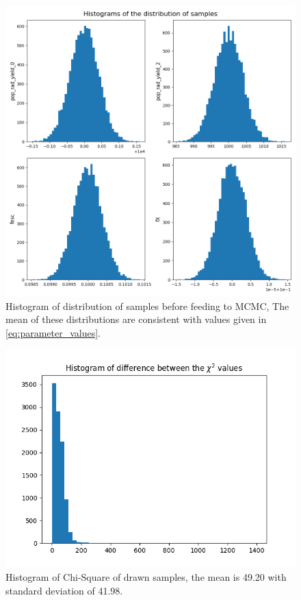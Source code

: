 \documentclass[12pt, TexShade, letterpaper]{report}
\begin{document}
\begin{figure}[h!]
\centering
\includegraphics[scale =0.5]{histograms_known_curve.png}
\caption[Histogram of distribution of samples]{Histogram of distribution of samples before feeding to MCMC, The mean of these distributions are consistent with values given in \ref{eq:parameter_values}.}
\label{fig:histogram_samples_known_curve}
\end{figure}

\begin{figure}[h!]
\centering
\includegraphics[scale =0.7]{csq_hist_known_curve.png}
\caption[Histogram of Chi-Square of drawn samples]{Histogram of Chi-Square of drawn samples, the mean is 49.20 with standard deviation of 41.98.}
\label{fig:csq_hist_known_curve}
\end{figure}
\end{document}
